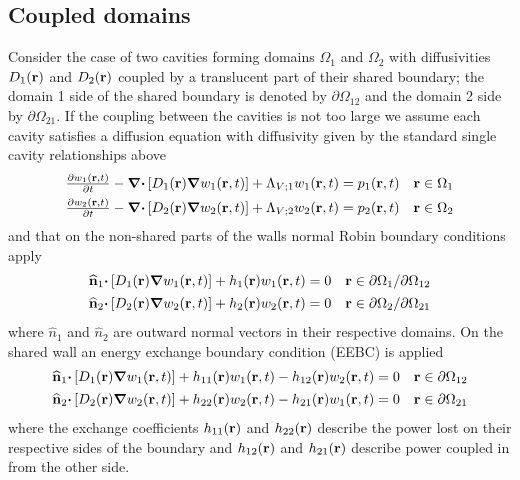 \documentclass[a4paper]{article}
\numberwithin{equation}{section}
\begin{document}
\subsection[Coupled domains]{Coupled domains}
\label{sc:sum:coup}

Consider the case of two cavities forming domains $\Omega_1$ and $\Omega_2$ with
diffusivities $D_1\pr$ and $D_2\pr$ coupled by a translucent part of their 
shared boundary; the domain 1 side of the shared boundary is denoted by 
${\partial}\Omega_{12}$ and the domain 2 side by ${\partial}\Omega_{21}$.
If the coupling between the cavities is not too large we assume each cavity 
satisfies a diffusion equation with diffusivity given by the standard single 
cavity relationships above
\begin{align}
\begin{matrix}
\frac{{\partial}w_1\prt}{{\partial}t}-{\vnabla}{\vcdot}\left[D_1\pr{\vnabla}w_1\prt\right]+\Lambda_{V;1}w_1\prt = p_1\prt &\vr\in\Omega_1
\end{matrix} \\
\begin{matrix}
\frac{{\partial}w_2\prt}{{\partial}t}-{\vnabla}{\vcdot}\left[D_2\pr{\vnabla}w_2\prt\right]+\Lambda_{V;2}w_2\prt = p_2\prt &\vr\in\Omega_2
\end{matrix}
\end{align}
and that on the non-shared parts of the walls normal Robin boundary conditions
apply
\begin{align}
\begin{matrix}
\uvn_1{\vcdot}\left[D_1\pr{\vnabla}w_1\prt\right]+h_1\pr w_1\prt = 0 &\vr\in\partial\Omega_1/\partial\Omega_{12}
\end{matrix}\\
\begin{matrix}
\uvn_2{\vcdot}\left[D_2\pr{\vnabla}w_2\prt\right]+h_2\pr w_2\prt = 0 &\vr\in\partial\Omega_2/\partial\Omega_{21}
\end{matrix}
\end{align}
where  $\widehat  n_1$ and  $\widehat  n_2$ are outward normal vectors in their
respective domains. On the shared wall an energy exchange boundary condition (EEBC) is
applied~\citep{Billon2008}
\begin{align}
\begin{matrix}
\uvn_1{\vcdot}\left[D_1\pr{\vnabla}w_1\prt\right]+h_{11}\pr w_1\prt-h_{12}\pr w_2\prt = 0 &\vr\in\partial\Omega_{12}
\end{matrix}\\
\begin{matrix}
\uvn_2{\vcdot}\left[D_2\pr{\vnabla}w_2\prt\right]+h_{22}\pr w_2\prt-h_{21}\pr w_1\prt = 0 &\vr\in\partial\Omega_{21}
\end{matrix}
\end{align}
where the exchange coefficients $h_{11}\pr$ and $h_{22}\pr$ describe the power lost 
on their respective sides of the boundary and $h_{12}\pr$ and $h_{21}\pr$ describe power
coupled in from the other side.
\end{document}

